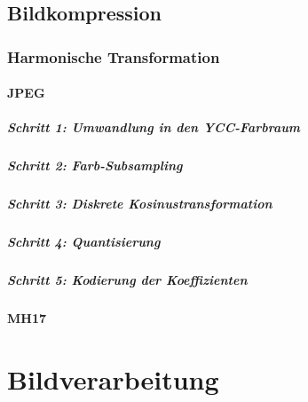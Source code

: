 \documentclass[a4paper, 11pt, accentcolor = tud3b]{tudreport}
\begin{document}
		\section{Bildkompression} %

			\subsection{Harmonische Transformation} %

				\subsubsection{JPEG} %

					\paragraph{Schritt 1: Umwandlung in den YCC-Farbraum} %

					\paragraph{Schritt 2: Farb-Subsampling} %

					\paragraph{Schritt 3: Diskrete Kosinustransformation} %

					\paragraph{Schritt 4: Quantisierung} %

					\paragraph{Schritt 5: Kodierung der Koeffizienten} %

				\subsubsection{MH17} %

	\chapter{Bildverarbeitung} %
\end{document}
